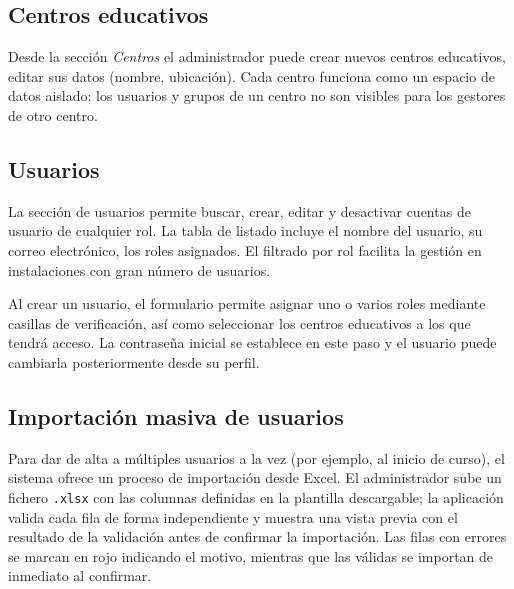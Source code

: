 \documentclass[12pt, a4paper]{report}
\begin{document}

\subsection{Centros educativos}

Desde la sección \textit{Centros} el administrador puede crear nuevos centros educativos,
editar sus datos (nombre, ubicación). Cada centro funciona como un espacio de datos aislado: los usuarios y grupos de un centro no son visibles para los gestores de otro centro.



\subsection{Usuarios}

La sección de usuarios permite buscar, crear, editar y desactivar cuentas de usuario de
cualquier rol. La tabla de listado incluye el nombre del usuario, su correo electrónico,
los roles asignados.
El filtrado por rol facilita la gestión en instalaciones con gran número de
usuarios.


Al crear un usuario, el formulario permite asignar uno o varios roles mediante
casillas de verificación, así como seleccionar los centros educativos a los que tendrá
acceso. La contraseña inicial se establece en este paso y el usuario puede cambiarla
posteriormente desde su perfil.


\subsection{Importación masiva de usuarios}

Para dar de alta a múltiples usuarios a la vez (por ejemplo, al inicio de curso), el
sistema ofrece un proceso de importación desde Excel. El administrador sube un fichero
\texttt{.xlsx} con las columnas definidas en la plantilla descargable; la aplicación
valida cada fila de forma independiente y muestra una vista previa con el resultado de
la validación antes de confirmar la importación. Las filas con errores se marcan en rojo
indicando el motivo, mientras que las válidas se importan de inmediato al confirmar.
\end{document}
